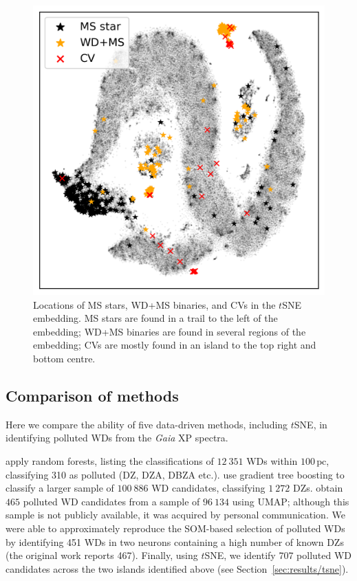 \documentclass[fleqn,usenatbib]{rasti}
\begin{document}
\begin{figure}
\centering
\includegraphics[width=\columnwidth]{figures/fig6_ms.png}
\caption{
    Locations of MS stars, WD+MS binaries, and CVs in the $t$SNE embedding.
    MS stars are found in a trail to the left of the embedding; WD+MS binaries are found in several regions of the embedding; CVs are mostly found in an island to the top right and bottom centre.
}
\label{fig:mswdmscv}
\end{figure}


\subsection{Comparison of methods}
\label{sec:comparison}

Here we compare the ability of five data-driven methods, including $t$SNE, in identifying polluted WDs from the \textit{Gaia} XP spectra.

\citet{garciazamora23} apply random forests, listing the classifications of $12~351$ WDs within $100\,\text{pc}$, classifying 310 as polluted (DZ, DZA, DBZA etc.).
\citet{vincent24} use gradient tree boosting to classify a larger sample of $100~886$ WD candidates, classifying $1~272$ DZs.
\citet{kao24} obtain $465$ polluted WD candidates from a sample of $96~134$ using UMAP; although this sample is not publicly available, it was acquired by personal communication.
We were able to approximately reproduce the SOM-based selection of polluted WDs by \citet{perezcouto24} identifying 451 WDs in two neurons containing a high number of known DZs (the original work reports 467).
Finally, using $t$SNE, we identify 707 polluted WD candidates across the two islands identified above (see Section~\ref{sec:results/tsne}).
\end{document}

